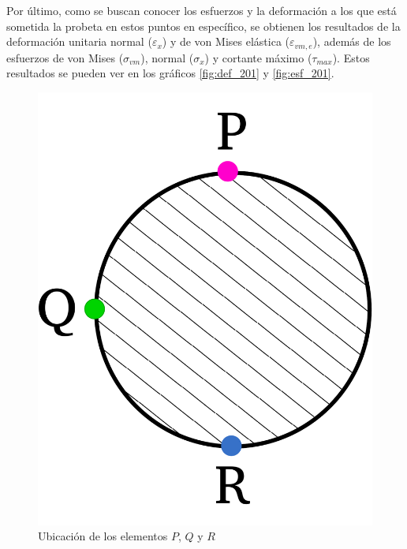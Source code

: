 \newpage

Por último, como se buscan conocer los esfuerzos y la deformación a los que está sometida la probeta en estos puntos en específico, se obtienen los resultados de la deformación unitaria normal ($\varepsilon_x$) y de von Mises elástica ($\varepsilon_{vm,e}$), además de los esfuerzos de von Mises ($\sigma_{vm}$), normal ($\sigma_x$) y cortante máximo ($\tau_{max}$). Estos resultados se pueden ver en los gráficos \ref{fig:def_201} y \ref{fig:esf_201}.

\begin{figure}[h]
\centering
\includegraphics[width=0.2\linewidth]{Imagenes/diagelem_pqr.pdf}
\caption{Ubicación de los elementos $P$, $Q$ y $R$}
\label{fig:diag_pqr2}
\end{figure}

